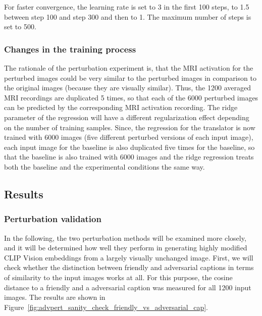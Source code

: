 For faster convergence, the learning rate is set to 3 in the first 100 steps, to 1.5 between step 100 and step 300 and then to 1. The maximum number of steps is set to 500. 


\subsubsection{Changes in the training  process}

 The rationale of the perturbation experiment is, that the MRI activation for the perturbed images could be very similar to the perturbed images in comparison to the original images (because they are visually similar). Thus, the 1200 averaged MRI recordings are duplicated 5 times, so that each of the 6000 perturbed images can be predicted by the corresponding MRI activation recording. The ridge parameter of the regression will have a different regularization effect depending on the number of training samples. Since, the regression for the translator is now trained with 6000 images (five different perturbed versions of each input image), each input image for the baseline is also duplicated five times for the baseline, so that the baseline is also trained with 6000 images and the ridge regression treats both the baseline and the experimental conditions the same way.

\subsection{Results}

\subsubsection{Perturbation validation}
In the following, the two perturbation methods will be examined more closely, and it will be determined how well they perform in generating highly modified CLIP Vision embeddings from a largely visually unchanged image. First, we will check whether the distinction between friendly and adversarial captions in terms of similarity to the input images works at all. For this purpose, the cosine distance to a friendly and a adversarial caption was measured for all 1200 input images. The results are shown in Figure~\ref{fig:advpert_sanity_check_friendly_vs_adversarial_cap}.

